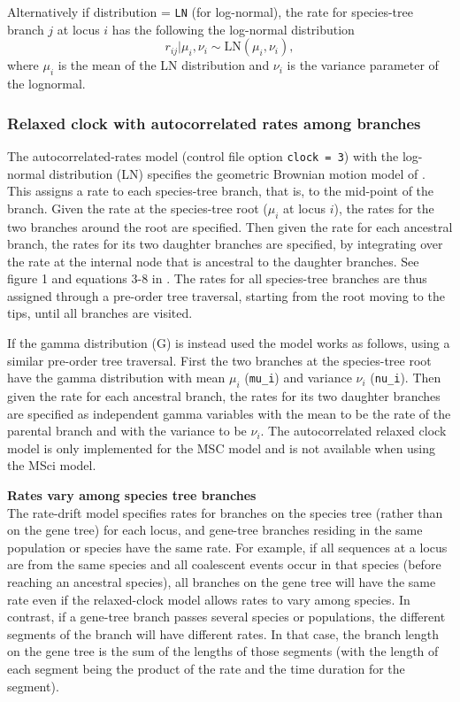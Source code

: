 \documentclass[a4paper]{book}
\numberwithin{equation}{section} \renewcommand{\baselinestretch}{0.55}
\begin{document}
Alternatively if distribution = \texttt{LN} (for log-normal), the rate
for species-tree branch $j$ at locus $ i $ has the following the
log-normal distribution
\begin{equation}
  r_{ij} | \mu_i, \nu_i \sim \mathrm{LN}(\mu_i, \nu_i),
\end{equation}
where $\mu_i$ is the mean of the LN distribution and $\nu_i$ is the
variance parameter of the lognormal.

\subsubsection{Relaxed clock with autocorrelated rates among branches}
The autocorrelated-rates model (control file option \texttt{clock =
  3}) with the log-normal distribution (LN) specifies the geometric
Brownian motion model of \citet{Rannala2007}.  This assigns a rate to
each species-tree branch, that is, to the mid-point of the branch.
Given the rate at the species-tree root ($\mu_i$ at locus $i$), the
rates for the two branches around the root are specified.  Then given
the rate for each ancestral branch, the rates for its two daughter
branches are specified, by integrating over the rate at the internal
node that is ancestral to the daughter branches. See figure 1 and
equations 3-8 in \citet{Rannala2007}.  The rates for all species-tree
branches are thus assigned through a pre-order tree traversal,
starting from the root moving to the tips, until all branches are
visited.

If the gamma distribution (G) is instead used the model works as
follows, using a similar pre-order tree traversal.  First the two
branches at the species-tree root have the gamma distribution with
mean $\mu_i$ (\texttt{mu\_i}) and variance $\nu_i$ (\texttt{nu\_i}).
Then given the rate for each ancestral branch, the rates for its two
daughter branches are specified as independent gamma variables with
the mean to be the rate of the parental branch and with the variance
to be $\nu_i$.  The autocorrelated relaxed clock model is only
implemented for the MSC model and is not available when using the MSci
model.

\begin{mdframed}
  \textbf{Rates vary among species tree branches}\\
  The rate-drift model specifies rates for branches on the species
  tree (rather than on the gene tree) for each locus, and gene-tree
  branches residing in the same population or species have the same
  rate.  For example, if all sequences at a locus are from the same
  species and all coalescent events occur in that species (before
  reaching an ancestral species), all branches on the gene tree will
  have the same rate even if the relaxed-clock model allows rates to
  vary among species.  In contrast, if a gene-tree branch passes
  several species or populations, the different segments of the branch
  will have different rates.  In that case, the branch length on the
  gene tree is the sum of the lengths of those segments (with the
  length of each segment being the product of the rate and the time
  duration for the segment).
\end{mdframed}
\end{document}
